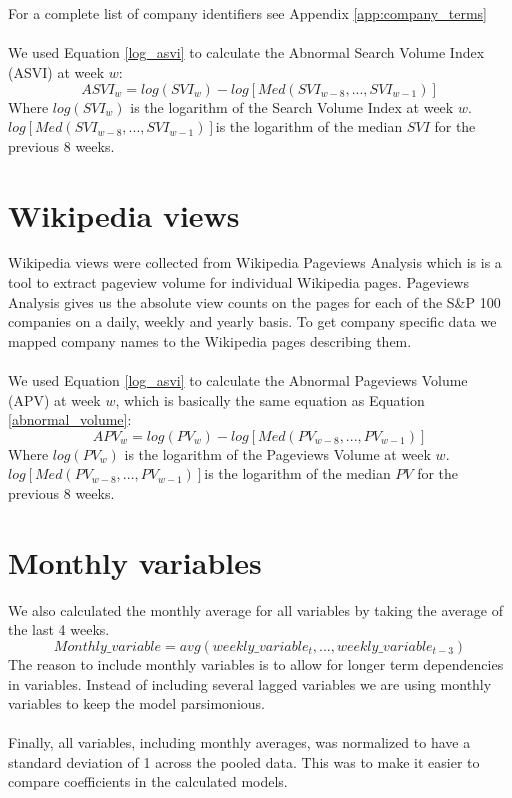 \\\\
For a complete list of company identifiers see Appendix \ref{app:company_terms}
\\\\
We used Equation \eqref{log_asvi} to calculate the Abnormal Search Volume Index (ASVI) at week $w$:
\begin{equation}
   \label{log_asvi} 
   ASVI_{w} = log(SVI_{w}) - log[Med(SVI_{w-8},...,SVI_{w-1})] 
\end{equation}
Where $log(SVI_{w})$ is the logarithm of the Search Volume Index at week $w$. $log[Med(SVI_{w-8},...,SVI_{w-1})]$is the logarithm of the median $SVI$ for the previous 8 weeks.

\section{Wikipedia views}

Wikipedia views were collected from Wikipedia Pageviews Analysis which is is a tool to extract pageview volume for individual Wikipedia pages. Pageviews Analysis gives us the absolute view counts on the pages for each of the S\&P 100 companies on a daily, weekly and yearly basis. To get company specific data we mapped company names to the Wikipedia pages describing them.
\\\\
We used Equation \eqref{log_asvi} to calculate the Abnormal Pageviews Volume (APV) at week $w$, which is basically the same equation as Equation \eqref{abnormal_volume}:
\begin{equation}
   \label{abnormal_pageviews_volume} 
   APV_{w} = log(PV_{w}) - log[Med(PV_{w-8},...,PV_{w-1})] 
\end{equation}
   Where $log(PV_{w})$ is the logarithm of the Pageviews Volume at week $w$. $log[Med(PV_{w-8},...,PV_{w-1})]$is the logarithm of the median $PV$ for the previous 8 weeks.

\section{Monthly variables}
 We also calculated the monthly average for all variables by taking the average of the last 4 weeks. 
\begin{equation}
   \label{monthly_var} 
   Monthly\_variable = avg(weekly\_variable_{t},...,weekly\_variable_{t-3}) 
\end{equation}
The reason to include monthly variables is to allow for longer term dependencies in variables. Instead of including several lagged variables we are using monthly variables to keep the model parsimonious.
\\\\
Finally, all variables, including monthly averages, was normalized to have a standard deviation of 1 across the pooled data. This was to make it easier to compare coefficients in the calculated models. 

